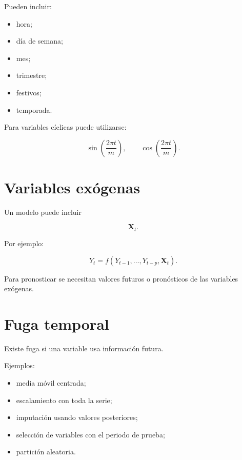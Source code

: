 \documentclass[
  spanish,
  10.5pt,
  letterpaper,
  DIV=11,
  numbers=noendperiod,
  oneside,
  open=any]{scrreprt}
\providecommand{\tightlist}{%
  \setlength{\itemsep}{0pt}\setlength{\parskip}{0pt}}
\theoremstyle{definition}
\theoremstyle{definition}
\theoremstyle{plain}
\theoremstyle{remark}
\begin{document}

Pueden incluir:

\begin{itemize}
\tightlist
\item
  hora;
\item
  día de semana;
\item
  mes;
\item
  trimestre;
\item
  festivos;
\item
  temporada.
\end{itemize}

Para variables cíclicas puede utilizarse:

\[
\sin
\left(
\frac{2\pi t}{m}
\right),
\qquad
\cos
\left(
\frac{2\pi t}{m}
\right).
\]

\section*{Variables exógenas}\label{variables-exuxf3genas}


Un modelo puede incluir

\[
\mathbf{X}_t.
\]

Por ejemplo:

\[
Y_t
=
f
\left(
Y_{t-1},\ldots,Y_{t-p},
\mathbf{X}_t
\right).
\]

Para pronosticar se necesitan valores futuros o pronósticos de las
variables exógenas.

\section*{Fuga temporal}\label{fuga-temporal}


Existe fuga si una variable usa información futura.

Ejemplos:

\begin{itemize}
\tightlist
\item
  media móvil centrada;
\item
  escalamiento con toda la serie;
\item
  imputación usando valores posteriores;
\item
  selección de variables con el periodo de prueba;
\item
  partición aleatoria.
\end{itemize}
\end{document}
